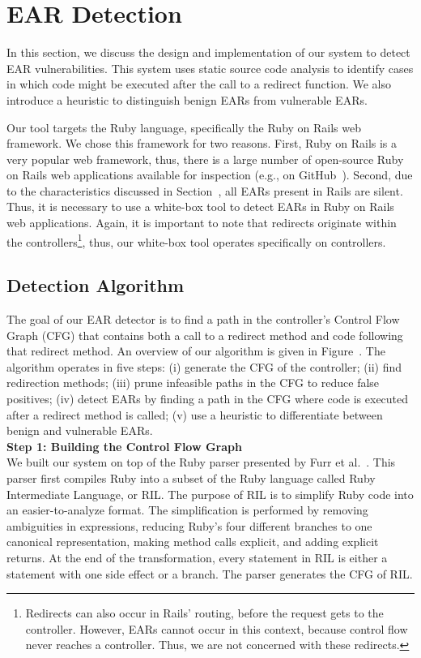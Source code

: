 \section{EAR Detection}

In this section, we discuss the design and implementation of our system
to detect EAR vulnerabilities. This system uses static source code
analysis to identify cases in which code might be executed after the
call to a redirect function. We also introduce a heuristic to
distinguish benign EARs from vulnerable EARs.

Our tool targets the Ruby language, specifically the Ruby on Rails web
framework. We chose this framework for two reasons. First, Ruby on Rails is
a very popular web framework, thus, there is a large number of open-source
Ruby on Rails web applications available for inspection (e.g., on
GitHub~\cite{github}). Second, due to the characteristics discussed in
Section~, all EARs present in Rails are silent. Thus, it is
necessary to use a white-box tool to detect EARs in Ruby on Rails web
applications. Again, it is important to note that redirects originate
within the controllers\footnote{Redirects can also occur in Rails' routing,
  before the request gets to the controller. However, EARs cannot occur in
  this context, because control flow never reaches a controller. Thus, we
  are not concerned with these redirects.}, thus, our white-box tool
operates specifically on controllers.

\subsection{Detection Algorithm}



The goal of our EAR detector is to find a path in the controller's
Control Flow Graph (CFG) that contains both a call to a redirect
method and code following that redirect method. An overview of our
algorithm is given in Figure~. The algorithm
operates in five steps: (i) generate the CFG of the controller; (ii)
find redirection methods; (iii) prune
infeasible paths in the CFG to reduce false positives; (iv) detect
EARs by finding a path in the CFG where code is executed after a
redirect method is called; (v) use a heuristic to differentiate
between benign and vulnerable EARs.
\\

\noindent\textbf{Step 1: Building the Control Flow Graph}\\
We built our system on top of the Ruby parser presented by Furr et
al.~\cite{furr09:ril}. This parser first compiles Ruby into a subset
of the Ruby language called Ruby Intermediate Language, or RIL. The
purpose of RIL is to simplify Ruby code into an easier-to-analyze
format. The simplification is performed by removing ambiguities in
expressions, reducing Ruby's four different branches to one canonical
representation, making method calls explicit, and adding explicit
returns. At the end of the transformation, every statement in RIL is
either a statement with one side effect or a branch. The parser generates the CFG of RIL.


